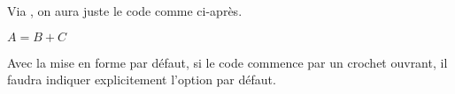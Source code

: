 \documentclass[10pt, a4paper]{article}
\begin{document}


\begin{tdocexa}
	Via , on aura juste le code comme ci-après.

    \begin{tdoclatex}[code]
        $A = B + C$
    \end{tdoclatex}
\end{tdocexa}




\begin{tdocwarn}
    Avec la mise en forme par défaut, si le code commence par un crochet ouvrant, il faudra indiquer explicitement l'option par défaut.
\end{tdocwarn}
\end{document}

